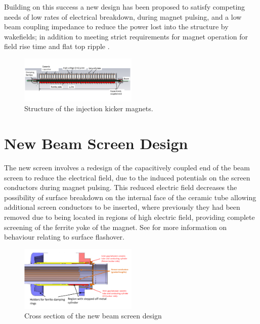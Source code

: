 \documentclass[a4paper,
              ]{jacow}
\begin{document}
Building on this success a new design has been proposed to satisfy competing needs of low rates of electrical breakdown, during magnet pulsing, and a low beam coupling impedance to reduce the power lost into the structure by wakefields; in addition to meeting strict requirements for magnet operation for field rise time and flat top ripple \cite{mkiUpgrade}. 

\begin{figure}
\includegraphics[width=0.5\textwidth]{TUPRI030f1.pdf}
\caption{Structure of the injection kicker magnets.}
\label{fig:mkiStruct}
\end{figure}

\section{New Beam Screen Design}

The new screen involves a redesign of the capacitively coupled end of the beam screen to reduce the electrical field, due to the induced potentials on the screen conductors during magnet pulsing. This reduced electric field decreases the possibility of surface breakdown on the internal face of the ceramic tube allowing additional screen conductors to be inserted, where previously they had been removed due to being located in regions of high electric field, providing complete screening of the ferrite yoke of the magnet. See \cite{mki-ElecBreakdown} for more information on behaviour relating to surface flashover. 

\begin{figure}
\begin{center}
\includegraphics[width=0.5\textwidth]{TUPRI030f2.pdf}
\caption{Cross section of the new beam screen design}
\label{fig:beamScreenCross}
\end{center}
\end{figure}
\end{document}
